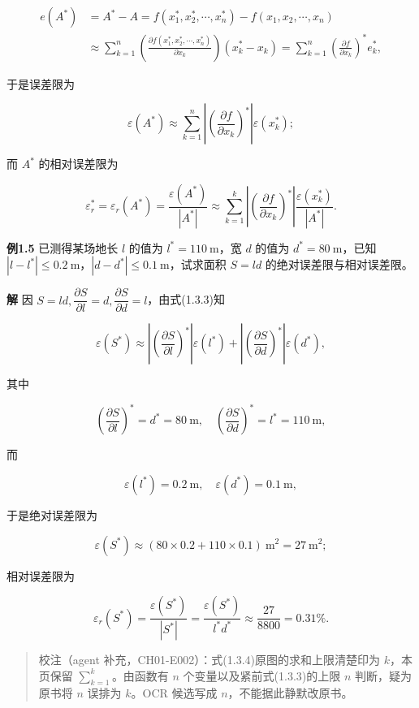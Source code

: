 \documentclass[
  10pt,
  fontset=fandol]{ctexart}
\begin{document}
\[
\begin{aligned}
e(A^*)&=A^*-A=f(x_1^*,x_2^*,\cdots,x_n^*)-f(x_1,x_2,\cdots,x_n)\\
&\approx\sum_{k=1}^{n}\left(\frac{\partial f(x_1^*,x_2^*,\cdots,x_n^*)}{\partial x_k}\right)(x_k^*-x_k)
=\sum_{k=1}^{n}\left(\frac{\partial f}{\partial x_k}\right)^*e_k^*,
\end{aligned}
\]

于是误差限为

\[
\varepsilon(A^*)\approx\sum_{k=1}^{n}\left|\left(\frac{\partial f}{\partial x_k}\right)^*\right|\varepsilon(x_k^*);
\tag{1.3.3}
\]

而 \(A^*\) 的相对误差限为

\[
\varepsilon_r^*=\varepsilon_r(A^*)=\frac{\varepsilon(A^*)}{|A^*|}\approx\sum_{k=1}^{k}\left|\left(\frac{\partial f}{\partial x_k}\right)^*\right|\frac{\varepsilon(x_k^*)}{|A^*|}.
\tag{1.3.4}
\]

\textbf{例1.5} 已测得某场地长 \(l\) 的值为 \(l^*=110\ \mathrm{m}\)，宽 \(d\) 的值为 \(d^*=80\ \mathrm{m}\)，已知 \(|l-l^*|\leqslant 0.2\ \mathrm{m}\)，\(|d-d^*|\leqslant 0.1\ \mathrm{m}\)，试求面积 \(S=ld\) 的绝对误差限与相对误差限。

\textbf{解} 因 \(S=ld,\dfrac{\partial S}{\partial l}=d,\dfrac{\partial S}{\partial d}=l\)，由式(1.3.3)知

\[
\varepsilon(S^*)\approx\left|\left(\frac{\partial S}{\partial l}\right)^*\right|\varepsilon(l^*)+\left|\left(\frac{\partial S}{\partial d}\right)^*\right|\varepsilon(d^*),
\]

其中

\[
\left(\frac{\partial S}{\partial l}\right)^*=d^*=80\ \mathrm{m},\quad
\left(\frac{\partial S}{\partial d}\right)^*=l^*=110\ \mathrm{m},
\]

而

\[
\varepsilon(l^*)=0.2\ \mathrm{m},\quad\varepsilon(d^*)=0.1\ \mathrm{m},
\]

于是绝对误差限为

\[
\varepsilon(S^*)\approx(80\times0.2+110\times0.1)\ \mathrm{m}^2=27\ \mathrm{m}^2;
\]

相对误差限为

\[
\varepsilon_r(S^*)=\frac{\varepsilon(S^*)}{|S^*|}=\frac{\varepsilon(S^*)}{l^*d^*}\approx\frac{27}{8800}=0.31\%.
\]

\begin{quote}
校注（agent 补充，CH01-E002）：式(1.3.4)原图的求和上限清楚印为 \(k\)，本页保留 \(\sum_{k=1}^{k}\)。由函数有 \(n\) 个变量以及紧前式(1.3.3)的上限 \(n\) 判断，疑为原书将 \(n\) 误排为 \(k\)。OCR 候选写成 \(n\)，不能据此静默改原书。
\end{quote}
\end{document}

